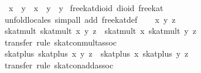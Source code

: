 \begin{isabellebody}
\ \ {}x\ {}\ y\ {}\ x\ {}\ y\ {}\ y{}\isanewline
\isanewline
{}\isamarkupfalse%
\ free{}kat{}dioid{}\ {}dioid\ free{}kat{}\isanewline
%
\isadelimproof
%
\endisadelimproof
%
\isatagproof
{}\isamarkupfalse%
\ {}unfold{}locales{}\ simp{}all\ add{}\ free{}kat{}def{}\isanewline
\ \ \isamarkupfalse%
\ x\ y\ z\isanewline
\ \ \isamarkupfalse%
\ {}skat{}mult\ {}skat{}mult\ x\ y{}\ z\ {}\ skat{}mult\ x\ {}skat{}mult\ y\ z{}{}\isanewline
\ \ \ \ \isamarkupfalse%
\ {}transfer{}\ rule\ skat{}con{}mult{}assoc{}\isanewline
\ \ \isamarkupfalse%
\ {}skat{}plus\ {}skat{}plus\ x\ y{}\ z\ {}\ skat{}plus\ x\ {}skat{}plus\ y\ z{}{}\isanewline
\ \ \ \ \isamarkupfalse%
\ {}transfer{}\ rule\ skat{}con{}add{}assoc{}\isanewline

\end{isabellebody}
